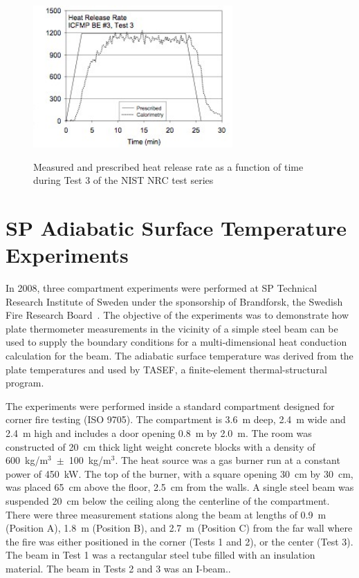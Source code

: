 \begin{figure}[\figoptions{t}]
\begin{center}
\includegraphics[width=3.0in]{FIGURES/NIST_NRC/NISTNRC_HRR}\\
\end{center}
\caption{Measured and prescribed heat release rate as a function of time during Test 3 of the NIST NRC test series}
 \label{fig:NISTNRC_HRR}
\end{figure}

\section{SP Adiabatic Surface Temperature Experiments}

In 2008, three compartment experiments were performed at SP Technical Research Institute of Sweden under the sponsorship of Brandforsk, the Swedish Fire Research Board~\cite{Wickstrom_AST}. The
objective of the experiments was to demonstrate how plate thermometer measurements in the vicinity of a simple steel beam can be used to supply the boundary conditions
for a multi-dimensional heat conduction calculation for the beam. The adiabatic surface temperature was derived from the plate temperatures and used by TASEF, a finite-element
thermal-structural program.

The experiments were performed inside a standard compartment designed for corner fire testing (ISO 9705).
The compartment is 3.6~m deep, 2.4~m wide and 2.4~m high and includes a door opening 0.8~m by 2.0~m. The room was constructed of 20~cm thick light weight concrete
blocks with a density of 600~kg/m$^3$~$\pm$~100~kg/m$^3$.
The heat source was a gas burner run at a constant power of 450~kW. The top of the burner, with a square opening 30~cm by 30~cm, was placed 65~cm above the floor, 2.5~cm from the walls.
A single steel beam was suspended 20~cm below the ceiling
along the centerline of the compartment. There were three measurement stations along the beam at lengths of 0.9~m (Position A), 1.8~m (Position B), and
2.7~m (Position C) from the far wall where the fire was either positioned in the corner (Tests 1 and 2), or the center (Test 3). The beam in Test 1 was
a rectangular steel tube filled with an insulation material. The beam in Tests 2 and 3 was an I-beam..

